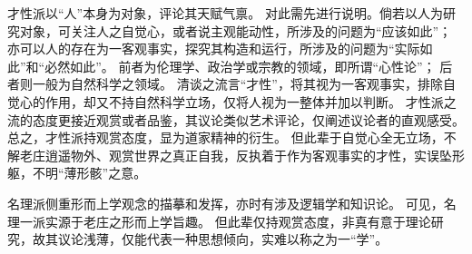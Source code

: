 \documentclass[11pt]{article}
\begin{document}
\par

才性派以“人”本身为对象，评论其天赋气禀。
对此需先进行说明。倘若以人为研究对象，可关注人之自觉心，或者说主观能动性，所涉及的问题为“应该如此”；
亦可以人的存在为一客观事实，探究其构造和运行，所涉及的问题为“实际如此”和“必然如此”。
前者为伦理学、政治学或宗教的领域，即所谓“心性论”；
后者则一般为自然科学之领域。
清谈之流言“才性”，将其视为一客观事实，排除自觉心的作用，却又不持自然科学立场，仅将人视为一整体并加以判断。
才性派之流的态度更接近观赏或者品鉴，其议论类似艺术评论，仅阐述议论者的直观感受。
总之，才性派持观赏态度，显为道家精神的衍生。
但此辈于自觉心全无立场，不解老庄逍遥物外、观赏世界之真正自我，反执着于作为客观事实的才性，实误坠形躯，不明“薄形骸”之意。

\par

名理派侧重形而上学观念的描摹和发挥，亦时有涉及逻辑学和知识论。
可见，名理一派实源于老庄之形而上学旨趣。
但此辈仅持观赏态度，非真有意于理论研究，故其议论浅薄，仅能代表一种思想倾向，实难以称之为一“学”。
\end{document}
